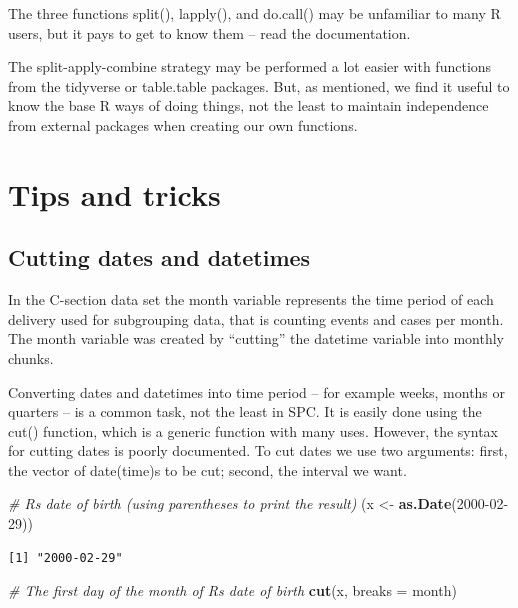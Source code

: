 \documentclass[
]{book}
\newenvironment{Shaded}{\begin{snugshade}}{\end{snugshade}}
\newcommand{\AttributeTok}[1]{\textcolor[rgb]{0.13,0.29,0.53}{#1}}
\newcommand{\CommentTok}[1]{\textcolor[rgb]{0.56,0.35,0.01}{\textit{#1}}}
\newcommand{\FunctionTok}[1]{\textcolor[rgb]{0.13,0.29,0.53}{\textbf{#1}}}
\newcommand{\NormalTok}[1]{#1}
\newcommand{\OtherTok}[1]{\textcolor[rgb]{0.56,0.35,0.01}{#1}}
\newcommand{\StringTok}[1]{\textcolor[rgb]{0.31,0.60,0.02}{#1}}
\begin{document}
The three functions split(), lapply(), and do.call() may be unfamiliar to many R users, but it pays to get to know them -- read the documentation.

The split-apply-combine strategy may be performed a lot easier with functions from the tidyverse or table.table packages. But, as mentioned, we find it useful to know the base R ways of doing things, not the least to maintain independence from external packages when creating our own functions.

\section{Tips and tricks}\label{tips-and-tricks}

\subsection{Cutting dates and datetimes}\label{cutting-dates-and-datetimes}

In the C-section data set the month variable represents the time period of each delivery used for subgrouping data, that is counting events and cases per month. The month variable was created by ``cutting'' the datetime variable into monthly chunks.

Converting dates and datetimes into time period -- for example weeks, months or quarters -- is a common task, not the least in SPC. It is easily done using the cut() function, which is a generic function with many uses. However, the syntax for cutting dates is poorly documented. To cut dates we use two arguments: first, the vector of date(time)s to be cut; second, the interval we want.

\begin{Shaded}
\begin{Highlighting}[]
\CommentTok{\# R\textquotesingle{}s date of birth (using parentheses to print the result)}
\NormalTok{(x }\OtherTok{\textless{}{-}} \FunctionTok{as.Date}\NormalTok{(}\StringTok{\textquotesingle{}2000{-}02{-}29\textquotesingle{}}\NormalTok{))}
\end{Highlighting}
\end{Shaded}

\begin{verbatim}
[1] "2000-02-29"
\end{verbatim}

\begin{Shaded}
\begin{Highlighting}[]
\CommentTok{\# The first day of the month of R\textquotesingle{}s date of birth}
\FunctionTok{cut}\NormalTok{(x, }\AttributeTok{breaks =} \StringTok{\textquotesingle{}month\textquotesingle{}}\NormalTok{)}
\end{Highlighting}
\end{Shaded}
\end{document}
